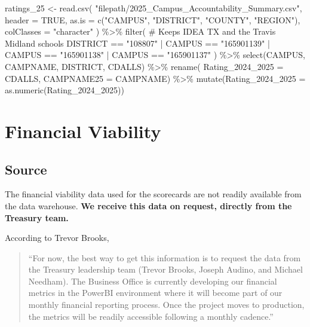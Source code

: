 \documentclass[
  letterpaper,
  DIV=11,
  numbers=noendperiod]{scrreprt}
\newenvironment{Shaded}{\begin{snugshade}}{\end{snugshade}}
\newcommand{\AttributeTok}[1]{\textcolor[rgb]{0.40,0.45,0.13}{#1}}
\newcommand{\CommentTok}[1]{\textcolor[rgb]{0.37,0.37,0.37}{#1}}
\newcommand{\ConstantTok}[1]{\textcolor[rgb]{0.56,0.35,0.01}{#1}}
\newcommand{\FunctionTok}[1]{\textcolor[rgb]{0.28,0.35,0.67}{#1}}
\newcommand{\NormalTok}[1]{\textcolor[rgb]{0.00,0.23,0.31}{#1}}
\newcommand{\OtherTok}[1]{\textcolor[rgb]{0.00,0.23,0.31}{#1}}
\newcommand{\SpecialCharTok}[1]{\textcolor[rgb]{0.37,0.37,0.37}{#1}}
\newcommand{\StringTok}[1]{\textcolor[rgb]{0.13,0.47,0.30}{#1}}
\begin{document}
\begin{Shaded}
\begin{Highlighting}[]
\NormalTok{ratings\_25  }\OtherTok{\textless{}{-}} \FunctionTok{read.csv}\NormalTok{(}
  \StringTok{"filepath/2025\_Campus\_Accountability\_Summary.csv"}\NormalTok{, }
    \AttributeTok{header =} \ConstantTok{TRUE}\NormalTok{, }
    \AttributeTok{as.is =} \FunctionTok{c}\NormalTok{(}\StringTok{"CAMPUS"}\NormalTok{, }\StringTok{"DISTRICT"}\NormalTok{, }\StringTok{"COUNTY"}\NormalTok{, }\StringTok{"REGION"}\NormalTok{),}
    \AttributeTok{colClasses =} \StringTok{"character"}
\NormalTok{  ) }\SpecialCharTok{\%\textgreater{}\%}
  \FunctionTok{filter}\NormalTok{( }\CommentTok{\# Keeps IDEA TX and the Travis Midland schools}
\NormalTok{    DISTRICT }\SpecialCharTok{==} \StringTok{"108807"} \SpecialCharTok{|} 
\NormalTok{    CAMPUS }\SpecialCharTok{==} \StringTok{"165901139"} \SpecialCharTok{|} 
\NormalTok{    CAMPUS }\SpecialCharTok{==} \StringTok{"165901138"} \SpecialCharTok{|} 
\NormalTok{    CAMPUS }\SpecialCharTok{==} \StringTok{"165901137"}\NormalTok{ ) }\SpecialCharTok{\%\textgreater{}\%} 
  \FunctionTok{select}\NormalTok{(CAMPUS, CAMPNAME, DISTRICT, CDALLS) }\SpecialCharTok{\%\textgreater{}\%}
  \FunctionTok{rename}\NormalTok{(}
    \AttributeTok{Rating\_2024\_2025 =}\NormalTok{ CDALLS,}
    \AttributeTok{CAMPNAME25 =}\NormalTok{ CAMPNAME) }\SpecialCharTok{\%\textgreater{}\%}
  \FunctionTok{mutate}\NormalTok{(}\AttributeTok{Rating\_2024\_2025 =} \FunctionTok{as.numeric}\NormalTok{(Rating\_2024\_2025))}
\end{Highlighting}
\end{Shaded}


\chapter{Financial Viability}\label{sec-Finance}

\section{Source}\label{source-2}

The financial viability data used for the scorecards are not readily
available from the data warehouse. \textbf{We receive this data on
request, directly from the Treasury team.}

According to Trevor Brooks,

\begin{quote}
``For now, the best way to get this information is to request the data
from the Treasury leadership team (Trevor Brooks, Joseph Audino, and
Michael Needham). The Business Office is currently developing our
financial metrics in the PowerBI environment where it will become part
of our monthly financial reporting process. Once the project moves to
production, the metrics will be readily accessible following a monthly
cadence.''
\end{quote}
\end{document}
